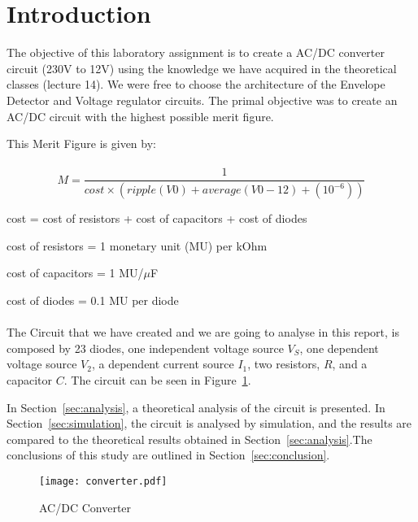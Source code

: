 \section{Introduction}
\label{sec:introduction}

The objective of this laboratory assignment is to create a AC/DC converter circuit (230V to 12V) using the knowledge  we have acquired in the theoretical classes (lecture 14). We were free to choose the architecture of the Envelope Detector and Voltage regulator circuits. The primal objective was to create an AC/DC circuit with the highest possible merit figure.

This Merit Figure is given by:
\paragraph{}

\begin{equation}
    M = \frac{1}{cost\times(ripple(V0) + average(V0-12) + (10^{-6}))}  
\end{equation}



cost = cost of resistors + cost of capacitors + cost of diodes

cost of resistors = 1 monetary unit (MU) per kOhm

cost of capacitors = 1 MU/$\mu$F

cost of diodes = 0.1 MU per diode
\paragraph{}



The Circuit that we have created and  we are going to analyse in this report, is composed by 23 diodes, one independent voltage source $V_S$, one dependent voltage source $V_2$, a dependent current source $I_1$, two resistors, $R$, and a capacitor $C$.
The circuit can be seen in Figure~\ref{fig:conv}.

In Section~\ref{sec:analysis}, a theoretical analysis of the circuit is
presented. In Section~\ref{sec:simulation}, the circuit is analysed by
simulation, and the results are compared to the theoretical results obtained in
Section~\ref{sec:analysis}.The conclusions of this study are outlined in
Section~\ref{sec:conclusion}.

\begin{figure}[h] \centering
\texttt{[image: converter.pdf]}
\caption{AC/DC Converter}
\label{fig:conv}
\end{figure}


